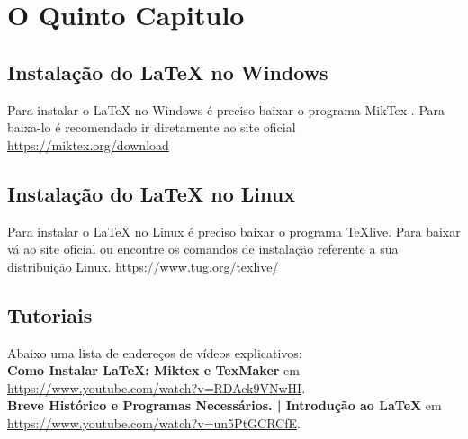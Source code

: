 \chapter{O Quinto Capitulo}

\section{Instalação do LaTeX no Windows}

Para instalar o LaTeX no Windows é preciso baixar o programa MikTex . Para baixa-lo é recomendado ir diretamente ao site oficial \url{https://miktex.org/download}


\section{Instalação do LaTeX no Linux}

Para instalar o LaTeX no Linux é preciso baixar o programa TeXlive. Para baixar vá ao site oficial ou encontre os comandos de instalação referente a sua distribuição Linux. \url{https://www.tug.org/texlive/}

\section{Tutoriais}
Abaixo uma lista de endereços de vídeos explicativos:\\

\textbf{Como Instalar LaTeX: Miktex e TexMaker} em \\ \url{https://www.youtube.com/watch?v=RDAck9VNwHI}. \\

\textbf{Breve Histórico e Programas Necessários. | Introdução ao LaTeX} em \\ \url{ https://www.youtube.com/watch?v=un5PtGCRCfE}. \\

